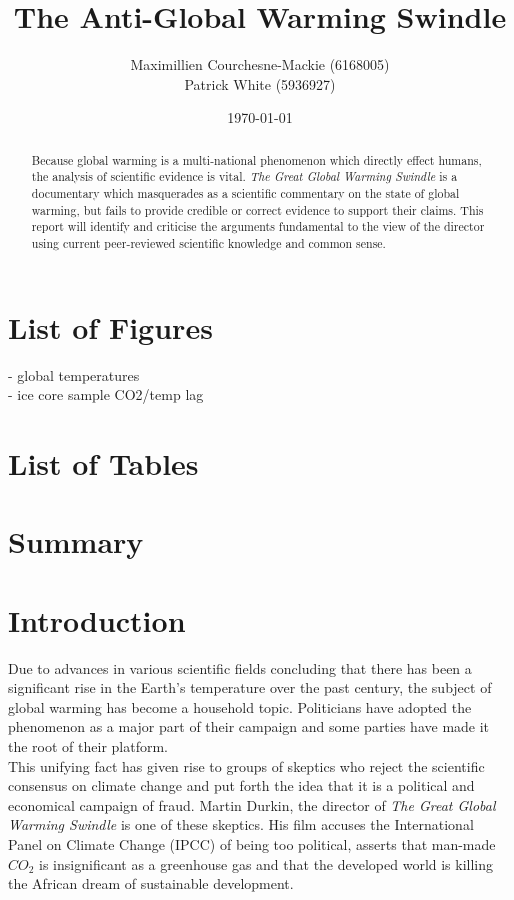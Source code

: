 \documentclass[12pt]{article}
\title{The Anti-Global Warming Swindle}
\author{Maximillien Courchesne-Mackie (6168005) \\
             Patrick White (5936927)}
\date{\today}
\begin{document}
\maketitle
\newpage

\begin{abstract}
    Because global warming is a multi-national phenomenon which directly effect humans, the analysis of scientific evidence is vital. \textit{The Great Global Warming Swindle} is a documentary which masquerades as a scientific commentary on the state of global warming, but fails to provide credible or correct evidence to support their claims. This report will identify and criticise the arguments fundamental to the view of the director using current peer-reviewed scientific knowledge and common sense.
\end{abstract}
\newpage

\tableofcontents
\newpage

\section*{List of Figures}
    - global temperatures \\
    - ice core sample CO2/temp lag
\section*{List of Tables}
\newpage

\section*{Summary}
\newpage

\section{Introduction}
	Due to advances in various scientific fields concluding that there has been a significant rise in the Earth's temperature over the past century, the subject of global warming has become a household topic. Politicians have adopted the phenomenon as a major part of their campaign and some parties have made it the root of their platform. \\
	
	This unifying fact has given rise to groups of skeptics who reject the scientific consensus on climate change and put forth the idea that it is a political and economical campaign of fraud. Martin Durkin, the director of \textit{The Great Global Warming Swindle} is one of these skeptics. His film accuses the International Panel on Climate Change (IPCC) of being too political, asserts that man-made $CO_2$ is insignificant as a greenhouse gas and that the developed world is killing the African dream of sustainable development. \\
	
\end{document}
